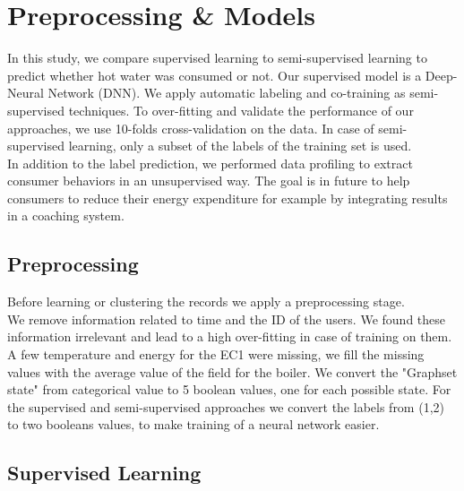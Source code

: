 \documentclass{llncs}
\begin{document}
\section{Preprocessing \& Models} 
In this study, we compare supervised learning to semi-supervised learning to predict whether hot water was consumed or not. Our supervised model is a Deep-Neural Network (DNN). We apply automatic labeling and co-training as semi-supervised techniques.
To over-fitting and validate the performance of our approaches, we use 10-folds cross-validation on the data. In case of semi-supervised learning, only a subset of the labels of the training set is used.  
\\In addition to the label prediction, we performed data profiling to extract consumer behaviors in an unsupervised way. The goal is in future to help consumers to reduce their energy expenditure for example by integrating results in a coaching system. 
\subsection{Preprocessing}

Before learning or clustering the records we apply a preprocessing stage. 
\\We remove information related to time and the ID of the users. We found these information irrelevant and lead to a high over-fitting in case of training on them.
A few temperature and energy for the EC1 were missing, we fill the missing values with the average value of the field for the boiler.
We convert the "Graphset state" from categorical value to 5 boolean values, one for each possible state. 
For the supervised and semi-supervised approaches we convert the labels from (1,2) to two booleans values, to make training of a neural network easier. 



\subsection{Supervised Learning}
\end{document}

